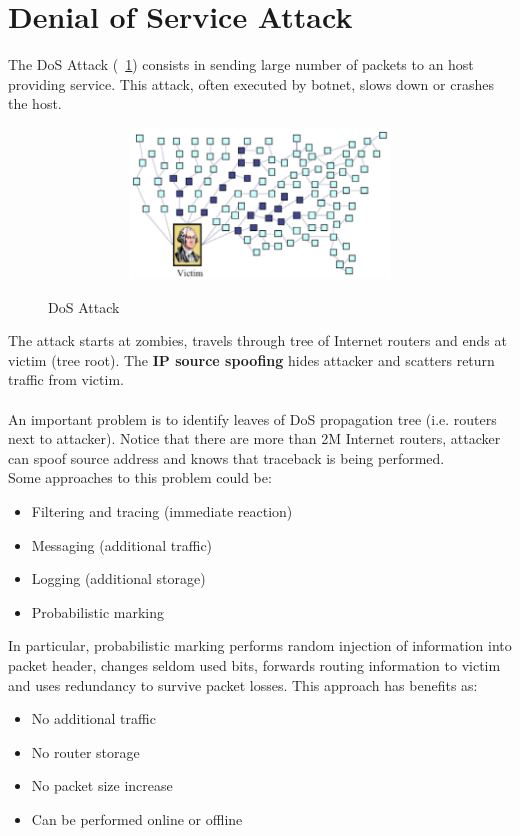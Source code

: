 \section{Denial of Service Attack}
The DoS Attack (\figurename~\ref{fig:DoS_Attack}) consists in sending large number of packets to an host providing service. This attack, often executed by botnet, slows down or crashes the host. 
\begin{figure}[htbp]
	\centering%
	\subfigure%
	{\includegraphics[height=4cm, width=12cm, keepaspectratio]{Immagini/reti/DoS_Attack.png}}
	\caption{DoS Attack\label{fig:DoS_Attack}} 	
\end{figure}
The attack starts at zombies, travels through tree of Internet routers and ends at victim (tree root). The \textbf{IP source spoofing} hides attacker and scatters return traffic from victim.\\ \\
An important problem is to identify leaves of DoS propagation tree (i.e. routers next to attacker). Notice that there are more than 2M Internet routers, attacker can spoof source address and knows that traceback is being performed.\\
Some approaches to this problem could be:
\begin{itemize}
\item Filtering and tracing (immediate reaction)
\item Messaging (additional traffic)
\item Logging (additional storage)
\item Probabilistic marking
\end{itemize}
In particular, probabilistic marking performs random injection of information into packet header, changes seldom used bits, forwards routing information to victim and uses redundancy to survive packet losses. This approach has benefits as:
\begin{itemize}
\item No additional traffic
\item No router storage
\item No packet size increase
\item Can be performed online or offline
\end{itemize}

